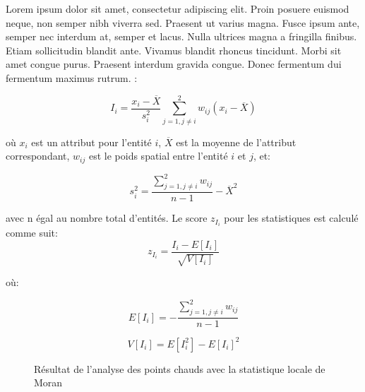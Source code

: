 Lorem ipsum dolor sit amet, consectetur adipiscing elit. Proin posuere euismod neque, non semper nibh viverra sed. Praesent ut varius magna. Fusce ipsum ante, semper nec interdum at, semper et lacus. Nulla ultrices magna a fringilla finibus. Etiam sollicitudin blandit ante. Vivamus blandit rhoncus tincidunt. Morbi sit amet congue purus. Praesent interdum gravida congue. Donec fermentum dui fermentum maximus rutrum. \parencite{hart_kernel_2014} :

\medskip

\begin{equation}
    I_i = \frac{x_i - \overline{X}}{ s_i^{2}} \sum_{j=1,j\neq i}^2 w_{ij}  (x_i - \overline{X})
\end{equation}

\medskip

où $x_i$ est un attribut pour l'entité $i$,  $\overline{X}$ est la moyenne de l'attribut correspondant, $w_{ij}$ est le poids spatial entre l'entité $i$ et $j$, et:

\medskip

\begin{equation}
    s_i^2 = \frac{\sum_{j=1,j\neq i}^2 w_{ij}  }{n-1} - \overline{X}^2
\end{equation}

\medskip
avec n égal au nombre total d'entités.
Le score $z_{I_{i}}$ pour les statistiques est calculé comme suit:
\medskip
\begin{equation}
    z_{I_{i}} = \frac{I_i - E [I_i]}{\sqrt{V[I_i]}}
\end{equation}

où:
\medskip

\begin{equation}
    E[I_i] = -\frac{\sum_{j=1,j\neq i}^2 w_{ij} }{n-1}
\end{equation}

\begin{equation}
    V[I_i] = E[I_i^2] - E[I_i]^2
\end{equation}

\medskip

\begin{figure}[hbt!]
  \centering
  \caption{Résultat de l'analyse des points chauds avec la statistique locale de Moran \parencite{aguilar_distribution_2013}}
  \label{fig:lsa-result}
\end{figure}
\FloatBarrier

